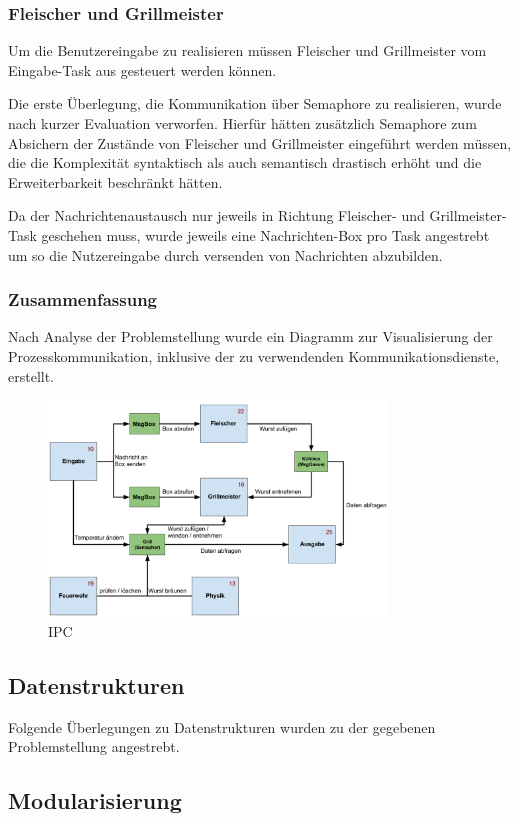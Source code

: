 \subsubsection{Fleischer und Grillmeister}

Um die Benutzereingabe zu realisieren müssen Fleischer und Grillmeister vom Eingabe-Task aus gesteuert werden können.

Die erste Überlegung, die Kommunikation über Semaphore zu realisieren, wurde nach kurzer Evaluation verworfen.
Hierfür hätten zusätzlich Semaphore zum Absichern der Zustände von Fleischer und Grillmeister eingeführt werden müssen,
die die Komplexität syntaktisch als auch semantisch drastisch erhöht und die Erweiterbarkeit beschränkt hätten.

Da der Nachrichtenaustausch nur jeweils in Richtung Fleischer- und Grillmeister-Task geschehen muss,
wurde jeweils eine Nachrichten-Box pro Task angestrebt um so die Nutzereingabe durch versenden von Nachrichten abzubilden.

\subsubsection{Zusammenfassung}

Nach Analyse der Problemstellung wurde ein Diagramm zur Visualisierung der Prozesskommunikation, inklusive der zu verwendenden Kommunikationsdienste, erstellt.

\begin{figure}[!ht]
  \caption{IPC}
  \centering
  \includegraphics[width=0.8\textwidth]{Bilder/diagramm_ipc.png}
\end{figure}

\subsection{Datenstrukturen}

Folgende Überlegungen zu Datenstrukturen wurden zu der gegebenen Problemstellung angestrebt.


\subsection{Modularisierung}
